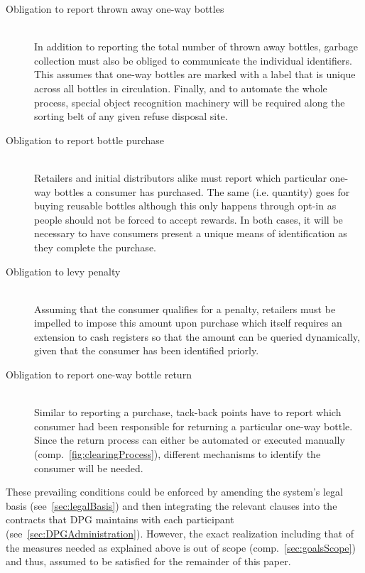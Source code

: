 \begin{description}
	\item[Obligation to report thrown away one-way bottles]
	\hfill \\
	In addition to reporting the total number of thrown away bottles\hide{(\ref{itm:reportNumber})}, garbage collection must also be obliged to communicate the individual identifiers\hide{(\ref{itm:reportIdentifier})}. This assumes that one-way bottles are marked with a label that is unique across all bottles in circulation. Finally, and to automate the whole process, special object recognition machinery will be required along the sorting belt of any given refuse disposal site.
	\item[Obligation to report bottle purchase]
	\hfill \\
	Retailers and initial distributors alike must report which particular one-way bottles a consumer has purchased\hide{(\ref{itm:reportOneWays})}. The same (i.e. quantity) goes for buying reusable bottles \hide{(\ref{itm:reportReusables})} although this only happens through opt-in as people should not be forced to accept rewards. In both cases, it will be necessary to have consumers present a unique means of identification as they complete the purchase.
	\item[Obligation to levy penalty]
	\hfill \\
	Assuming that the consumer qualifies for a penalty, retailers must be impelled to impose this amount upon purchase which itself requires an extension to cash registers so that the amount can be queried dynamically\hide{(\ref{itm:lookUpPenalty})}, given that the consumer has been identified priorly.
	\item[Obligation to report one-way bottle return]
	\hfill \\
	Similar to reporting a purchase, tack-back points have to report which consumer had been responsible for returning a particular one-way bottle\hide{(\ref{itm:reportOneWayReturn})}. Since the return process can either be automated or executed manually (comp.~\autoref{fig:clearingProcess}), different mechanisms to identify the consumer will be needed.  
\end{description}

These prevailing conditions could be enforced by amending the system's legal basis (see~\ref{sec:legalBasis}) and then integrating the relevant clauses into the contracts that \ac{DPG} maintains with each participant (see~\ref{sec:DPGAdministration}). However, the exact realization including that of the measures needed as explained above is out of scope (comp.~\ref{sec:goalsScope}) and thus, assumed to be satisfied for the remainder of this paper. 

